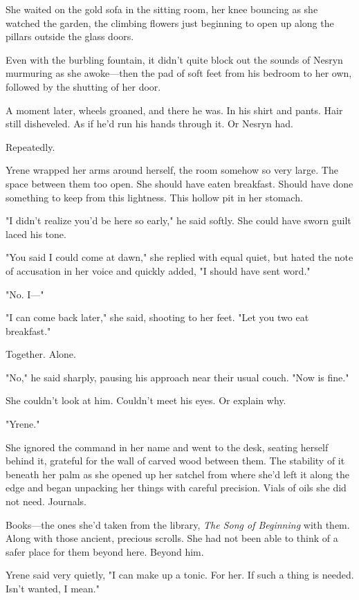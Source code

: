 She waited on the gold sofa in the sitting room, her knee bouncing as she watched the garden, the climbing flowers just beginning to open up along the pillars outside the glass doors.

Even with the burbling fountain, it didn't quite block out the sounds of Nesryn murmuring as she awoke---then the pad of soft feet from his bedroom to her own, followed by the shutting of her door.

A moment later, wheels groaned, and there he was. In his shirt and pants. Hair still disheveled. As if he'd run his hands through it. Or Nesryn had.

Repeatedly.

Yrene wrapped her arms around herself, the room somehow so very large. The space between them too open. She should have eaten breakfast. Should have done something to keep from this lightness. This hollow pit in her stomach.

"I didn't realize you'd be here so early," he said softly. She could have sworn guilt laced his tone.

"You said I could come at dawn," she replied with equal quiet, but hated the note of accusation in her voice and quickly added, "I should have sent word."

"No. I---"

"I can come back later," she said, shooting to her feet. "Let you two eat breakfast."

Together. Alone.

"No," he said sharply, pausing his approach near their usual couch. "Now is fine."

She couldn't look at him. Couldn't meet his eyes. Or explain why.

"Yrene."

She ignored the command in her name and went to the desk, seating herself behind it, grateful for the wall of carved wood between them. The stability of it beneath her palm as she opened up her satchel from where she'd left it along the edge and began unpacking her things with careful precision. Vials of oils she did not need. Journals.

Books---the ones she'd taken from the library, \emph{The Song of Beginning} with them. Along with those ancient, precious scrolls. She had not been able to think of a safer place for them beyond here. Beyond him.

Yrene said very quietly, "I can make up a tonic. For her. If such a thing is needed. Isn't wanted, I mean."

